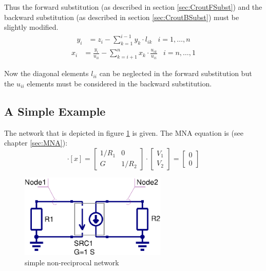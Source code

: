 Thus the forward substitution (as described in section
\ref{sec:CroutFSubst}) and the backward substitution (as described in
section \ref{sec:CroutBSubst}) must be slightly modified.
\begin{align}
y_{i} &= z_{i} - \sum_{k=1}^{i-1} y_{k}\cdot l_{ik} & i = 1,\ldots,n
\end{align}
\begin{align}
x_{i} &= \frac{y_{i}}{u_{ii}} - \sum_{k=i+1}^{n} x_{k}\cdot \frac{u_{ik}}{u_{ii}} & i = n,\ldots,1
\end{align}

Now the diagonal elements $l_{ii}$ can be neglected in the forward
substitution but the $u_{ii}$ elements must be considered in the
backward substitution.

\subsection{A Simple Example}

The network that is depicted in figure \ref{fig:mna_noise1} is given.
The MNA equation is (see chapter \ref{sec:MNA}):
\begin{equation}
[A]\cdot [x] =
\begin{bmatrix}
1/R_1 & 0\\
  G   & 1/R_2
\end{bmatrix}
\cdot
\begin{bmatrix}
V_1\\
V_2
\end{bmatrix}
=
\begin{bmatrix}
0\\
0
\end{bmatrix}
\end{equation}

\begin{figure}[ht]
\begin{center}
\includegraphics[width=7cm]{MNAnoise1}
\end{center}
\caption{simple non-reciprocal network}
\label{fig:mna_noise1}
\end{figure}
\FloatBarrier

